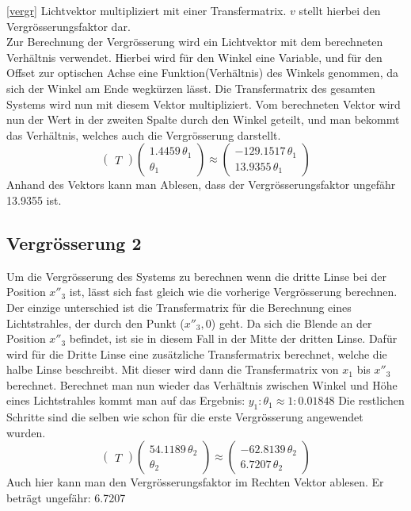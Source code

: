 \documentclass[11pt,twoside,a4paper]{article}
\begin{document}
	\ref{vergr} Lichtvektor multipliziert mit einer Transfermatrix. \(v\) stellt hierbei den Vergrösserungsfaktor dar.  \\
	Zur Berechnung der Vergrösserung wird ein Lichtvektor mit dem berechneten Verhältnis verwendet. Hierbei wird für den Winkel eine Variable, und für den Offset zur optischen Achse eine Funktion(Verhältnis) des Winkels genommen, da sich der Winkel am Ende wegkürzen lässt. Die Transfermatrix des gesamten Systems wird nun mit diesem Vektor multipliziert. Vom berechneten Vektor wird nun der Wert in der zweiten Spalte durch den Winkel geteilt, und man bekommt das Verhältnis, welches auch die Vergrösserung darstellt.
	\begin{equation}
	\begin{pmatrix}
	T
	\end{pmatrix}
	\begin{pmatrix}
	1.4459\,\theta_1 \\
	\theta_1 
	\end{pmatrix}
	\approx
	\begin{pmatrix}
	-129.1517\,\theta_1 \\
	13.9355\,\theta_1
	\end{pmatrix}
	\end{equation}
	Anhand des Vektors kann man Ablesen, dass der Vergrösserungsfaktor ungefähr 13.9355 ist.
	\subsection{Vergrösserung 2}
	Um die Vergrösserung des Systems zu berechnen wenn die dritte Linse bei der Position \(x''_{3}\) ist, lässt sich fast gleich wie die vorherige Vergrösserung berechnen. Der einzige unterschied ist die Transfermatrix für die Berechnung eines Lichtstrahles, der durch den Punkt (\(x''_{3},0\)) geht. Da sich die Blende an der Position \(x''_{3}\) befindet, ist sie in diesem Fall in der Mitte der dritten Linse. Dafür wird für die Dritte Linse eine zusätzliche Transfermatrix berechnet, welche die halbe Linse beschreibt. Mit dieser wird dann die Transfermatrix von \(x_{1}\) bis \(x''_{3}\) berechnet. Berechnet man nun wieder das Verhältnis zwischen Winkel und Höhe eines Lichtstrahles kommt man auf das Ergebnis: \(y_{1} : \theta_{1} \approx 1:0.01848\) Die restlichen Schritte sind die selben wie schon für die erste Vergrösserung angewendet wurden.
		\begin{equation}
	\begin{pmatrix}
	T
	\end{pmatrix}
	\begin{pmatrix}
	54.1189\,\theta_2 \\
	\theta_2  
	\end{pmatrix}
	\approx
	\begin{pmatrix}
	-62.8139\,\theta_2 \\
	6.7207\,\theta_2
	\end{pmatrix}
	\end{equation}
	Auch hier kann man den Vergrösserungsfaktor im Rechten Vektor ablesen. Er beträgt ungefähr: 6.7207
\end{document}

